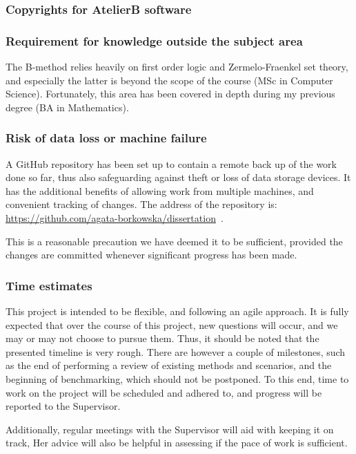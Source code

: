\documentclass[11pt,journal]{IEEEtran}
\begin{document}
	\subsubsection{Copyrights for AtelierB software}
	
	\subsubsection{Requirement for knowledge outside the subject area}
	The B-method relies heavily on first order logic and Zermelo-Fraenkel set theory, and especially the latter is beyond the scope of the course (MSc in Computer Science). Fortunately, this area has been covered in depth during my previous degree (BA in Mathematics).
	
	\subsubsection{Risk of data loss or machine failure}
	A GitHub repository has been set up to contain a remote back up of the work done so far, thus also safeguarding against theft or loss of data storage devices. It has the additional benefits of allowing work from multiple machines, and convenient tracking of changes. The address of the repository is: \url{https://github.com/agata-borkowska/dissertation}~.
	
	This is a reasonable precaution we have deemed it to be sufficient, provided the changes are committed whenever significant progress has been made.
	
	\subsubsection{Time estimates}
	This project is intended to be flexible, and following an agile approach. It is fully expected that over the course of this project, new questions will occur, and we may or may not choose to pursue them. Thus, it should be noted that the presented timeline is very rough. There are however a couple of milestones, such as the end of performing a review of existing methods and scenarios, and the beginning of benchmarking, which should not be postponed. To this end, time to work on the project will be scheduled and adhered to, and progress will be reported to the Supervisor.
	
	Additionally, regular meetings with the Supervisor will aid with keeping it on track, Her advice will also be helpful in assessing if the pace of work is sufficient.
	
\end{document}

